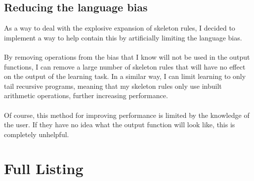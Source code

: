 \subsection{Reducing the language bias}
As a way to deal with the explosive expansion of skeleton rules, I decided to implement a way to help contain this by artificially limiting the language bias. \\ \\
By removing operations from the bias that I know will not be used in the output functions, I can remove a large number of skeleton rules that will have no effect on the output of the learning task. In a similar way, I can limit learning to only tail recursive programs, meaning that my skeleton rules only use inbuilt arithmetic operations, further increasing performance. \\ \\
Of course, this method for improving performance is limited by the knowledge of the user. If they have no idea what the output function will look like, this is completely unhelpful. 

\pagebreak
\section{Full Listing}


\pagebreak
%
%